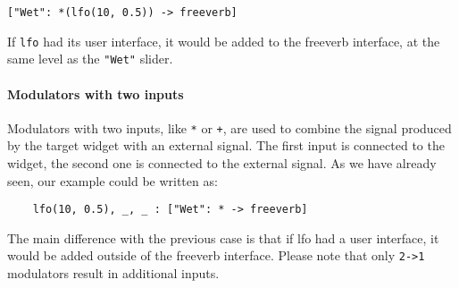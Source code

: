 \begin{lstlisting}
["Wet": *(lfo(10, 0.5)) -> freeverb]
\end{lstlisting}

If \lstinline'lfo' had its user interface, it would be added to the freeverb interface, at the same level as the \lstinline'"Wet"' slider.

\paragraph{Modulators with two inputs}
Modulators with two inputs, like \lstinline'*' or \lstinline'+', are used to combine the signal produced by the target widget with an external signal. The first input is connected to the widget, the second one is connected to the external signal. As we have already seen, our example could be written as:

\begin{lstlisting}
    lfo(10, 0.5), _, _ : ["Wet": * -> freeverb]
\end{lstlisting}
    
The main difference with the previous case is that if lfo had a user interface, it would be added outside of the freeverb interface. Please note that only \lstinline`2->1` modulators result in additional inputs. 

